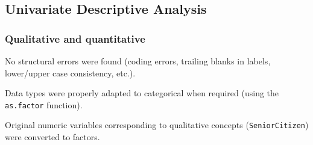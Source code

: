 \documentclass[
  a4paper]{article}
\begin{document}
\hypertarget{univariate-descriptive-analysis}{%
\subsection{Univariate Descriptive
Analysis}\label{univariate-descriptive-analysis}}

\hypertarget{qualitative-and-quantitative}{%
\subsubsection{Qualitative and
quantitative}\label{qualitative-and-quantitative}}

No structural errors were found (coding errors, trailing blanks in
labels, lower/upper case consistency, etc.).

Data types were properly adapted to categorical when required (using the
\texttt{as.factor} function).

Original numeric variables corresponding to qualitative concepts
(\texttt{SeniorCitizen}) were converted to factors.
\end{document}
